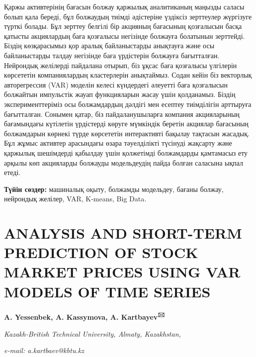 \documentclass[
]{article}
\begin{document}
Қаржы активтерінің бағасын болжау қаржылық аналитиканың маңызды саласы
болып қала береді, бұл болжаудың тиімді әдістеріне үздіксіз зерттеулер
жүргізуге түрткі болады. Бұл зерттеу белгілі бір акцияның бағасының
қозғалысын басқа қатысты акциялардың баға қозғалысы негізінде болжауға
болатынын зерттейді. Біздің көзқарасымыз қор аралық байланыстарды
анықтауға және осы байланыстарды талдау негізінде баға үрдістерін
болжауға бағытталған. Нейрондық желілерді пайдалана отырып, біз ұқсас
баға қозғалысы үлгілерін көрсететін компаниялардың кластерлерін
анықтаймыз. Содан кейін біз векторлық авторегрессия (VAR) моделін келесі
күндердегі әлеуетті баға қозғалысын болжайтын импульстік жауап
функцияларын жасау үшін қолданамыз. Біздің эксперименттеріміз осы
болжамдардың дәлдігі мен есептеу тиімділігін арттыруға бағытталған.
Сонымен қатар, біз пайдаланушыларға компания акцияларының бағамындағы
күтілетін үрдістерді көруге мүмкіндік беретін акциялар бағасының
болжамдарын көрнекі түрде көрсететін интерактивті бақылау тақтасын
жасадық. Бұл жұмыс активтер арасындағы өзара тәуелділікті түсінуді
жақсарту және қаржылық шешімдерді қабылдау үшін қолжетімді болжамдарды
қамтамасыз ету арқылы көп акцияларды болжауды модельдеудің пайда болған
саласына ықпал етеді.

\textbf{Түйін сөздер:} машиналық оқыту, болжамды модельдеу, бағаны
болжау, нейрондық желілер, VAR, K-means, Big Data\emph{.}

\section{\texorpdfstring{\textbf{ANALYSIS AND SHORT-TERM PREDICTION OF
STOCK MARKET PRICES USING VAR MODELS OF TIME
SERIES}}{ANALYSIS AND SHORT-TERM PREDICTION OF STOCK MARKET PRICES USING VAR MODELS OF TIME SERIES}}\label{analysis-and-short-term-prediction-of-stock-market-prices-using-var-models-of-time-series}

\textbf{A. Yessenbek, A. Kassymova, A. Kartbayev\textsuperscript{🖂}}

\emph{Kazakh-British Technical University, Almaty, Kazakhstan,}

\emph{e-mail: a.kartbaev@kbtu.kz}
\end{document}
